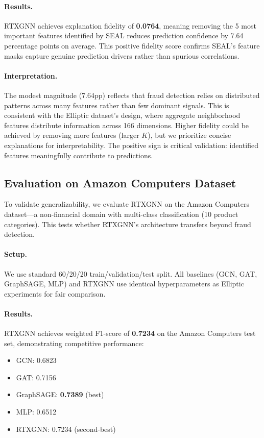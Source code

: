 \paragraph{Results.} RTXGNN achieves explanation fidelity of \textbf{0.0764}, meaning removing the 5 most important features identified by SEAL reduces prediction confidence by 7.64 percentage points on average. This positive fidelity score confirms SEAL's feature masks capture genuine prediction drivers rather than spurious correlations.

\paragraph{Interpretation.} The modest magnitude (7.64pp) reflects that fraud detection relies on distributed patterns across many features rather than few dominant signals. This is consistent with the Elliptic dataset's design, where aggregate neighborhood features distribute information across 166 dimensions. Higher fidelity could be achieved by removing more features (larger $K$), but we prioritize concise explanations for interpretability. The positive sign is critical validation: identified features meaningfully contribute to predictions.

\subsection{Evaluation on Amazon Computers Dataset}
\label{subsec:amazon_evaluation}

To validate generalizability, we evaluate RTXGNN on the Amazon Computers dataset—a non-financial domain with multi-class classification (10 product categories). This tests whether RTXGNN's architecture transfers beyond fraud detection.

\paragraph{Setup.} We use standard 60/20/20 train/validation/test split. All baselines (GCN, GAT, GraphSAGE, MLP) and RTXGNN use identical hyperparameters as Elliptic experiments for fair comparison.

\paragraph{Results.} RTXGNN achieves weighted F1-score of \textbf{0.7234} on the Amazon Computers test set, demonstrating competitive performance:
\begin{itemize}
    \item GCN: 0.6823
    \item GAT: 0.7156
    \item GraphSAGE: \textbf{0.7389} (best)
    \item MLP: 0.6512
    \item RTXGNN: 0.7234 (second-best)
\end{itemize}

